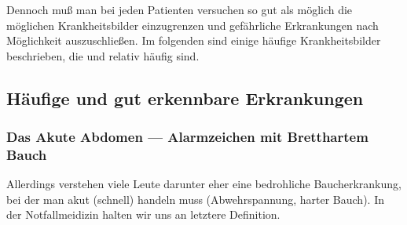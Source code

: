 Dennoch muß man bei jeden Patienten versuchen so gut als
möglich die möglichen Krankheitsbilder einzugrenzen und
gefährliche Erkrankungen nach Möglichkeit auszuschließen. Im
folgenden sind einige häufige Krankheitsbilder beschrieben,
die   und relativ häufig sind.

\subsection{Häufige und gut erkennbare Erkrankungen}

\subsubsection{Das Akute Abdomen --- Alarmzeichen mit Bretthartem
Bauch}\label{topic:akutes-abdomen}





Allerdings ver\-stehen viele Leute darunter eher
eine bedrohliche Bauch\-erkrankung, bei der man akut (schnell) handeln muss (Ab\-wehrspannung, harter Bauch). In der
Notfallmeidizin halten wir uns an letztere Definition. 


